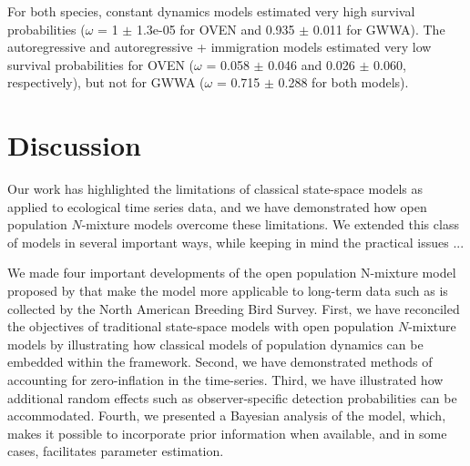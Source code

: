 \documentclass[12pt]{article}
\begin{document}
For both species, constant dynamics models estimated very high
survival probabilities ($\omega$ = 1 $\pm$ 1.3e-05 for OVEN and 0.935 $\pm$ 0.011 for
GWWA).   The autoregressive and autoregressive + immigration models
estimated very low survival probabilities for OVEN ($\omega$ = 0.058 $\pm$ 0.046
and 0.026 $\pm$ 0.060, respectively), but not for GWWA ($\omega$ = 0.715 $\pm$ 0.288
for both models).




\section{Discussion}

Our work has highlighted the limitations of classical state-space
models as applied to ecological time series data, and we have
demonstrated how open population $N$-mixture models overcome these
limitations. We extended this class of models in several important
ways, while keeping in mind the practical issues ...

We made four important developments of the open population
N-mixture model proposed by \citep{dail_madsen:2011} that make the
model more applicable to long-term data such as is collected
by the North American Breeding Bird Survey. First, we have
reconciled the objectives of traditional state-space models
with open population $N$-mixture models by illustrating how
classical models of population dynamics can be embedded within
the framework. Second, we have demonstrated methods of
accounting for zero-inflation in the time-series. Third, we
have illustrated how additional random effects such as
observer-specific detection probabilities can be
accommodated. Fourth, we presented a Bayesian analysis of the
model, which, makes it possible to incorporate prior information when
available, and in some cases, facilitates parameter estimation.
\end{document}
